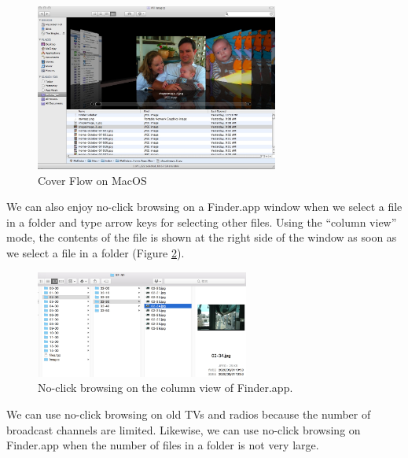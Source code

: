 \documentclass{article}
\begin{document}
\begin{figure}[H]
\centerline{\includegraphics[width=80mm,bb=0 0 1080 740]{figures/902678c6770b5e043baa6f503375749f.jpg}}
\caption{Cover Flow on MacOS}
\label{coverflow}
\end{figure}

We can also enjoy no-click browsing on a Finder.app window
when we select a file in a folder and
type arrow keys for selecting other files.
Using the ``column view'' mode, 
the contents of the file is shown at the right side of the window
as soon as we select a file in a folder (Figure \ref{noclickfinder}).

\begin{figure}[H]
\centerline{\includegraphics[width=70mm,bb=0 0 839 423]{figures/10d7ca6c55aa93ebcdab799246e4c087.jpg}}
\caption{No-click browsing on the column view of Finder.app.}
\label{noclickfinder}
\end{figure}



We can use no-click browsing on old TVs and radios because the number of
broadcast channels are limited.
Likewise, we can use no-click browsing on Finder.app when the number of files
in a folder is not very large.
\end{document}
